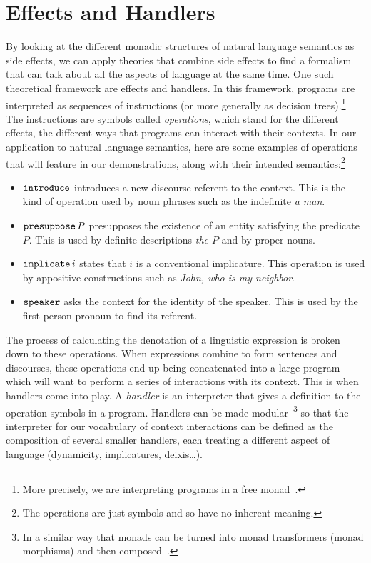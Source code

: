 \section*{Effects and Handlers}

By looking at the different monadic structures of natural language
semantics as side effects, we can apply theories that combine side effects
to find a formalism that can talk about all the aspects of language at the
same time. One such theoretical framework are effects and handlers. In this
framework, programs are interpreted as sequences of instructions (or more
generally as decision trees).\footnote{More precisely, we are interpreting
  programs in a free monad~\cite{swierstra2008data}.} The instructions are
symbols called \emph{operations}, which stand for the different effects,
the different ways that programs can interact with their contexts. In our
application to natural language semantics, here are some examples of
operations that will feature in our demonstrations, along with their
intended semantics:\footnote{The operations are just symbols and so have no
  inherent meaning.}

\begin{itemize}
\item $\mathtt{introduce}$ introduces a new discourse referent to the
  context. This is the kind of operation used by noun phrases such as the
  indefinite \emph{a man}.
\item $\mathtt{presuppose}\,P$ presupposes the existence of an entity
  satisfying the predicate $P$. This is used by definite descriptions
  \emph{the $P$} and by proper nouns.
\item $\mathtt{implicate}\,i$ states that $i$ is a conventional implicature.
  This operation is used by appositive constructions such as \emph{John, who is
    my neighbor}.
\item $\mathtt{speaker}$ asks the context for the identity of the speaker. This
  is used by the first-person pronoun to find its referent.
\end{itemize}

The process of calculating the denotation of a linguistic expression is
broken down to these operations. When expressions combine to form sentences
and discourses, these operations end up being concatenated into a large
program which will want to perform a series of interactions with its
context. This is when handlers come into play. A \emph{handler} is an
interpreter that gives a definition to the operation symbols in a
program. Handlers can be made modular~\footnote{In a similar way that
  monads can be turned into monad transformers (monad morphisms) and then
  composed~\cite{shan2002monads,wu2015transformers}.} so that the
interpreter for our vocabulary of context interactions can be defined as
the composition of several smaller handlers, each treating a different
aspect of language (dynamicity, implicatures, deixis\ldots).


